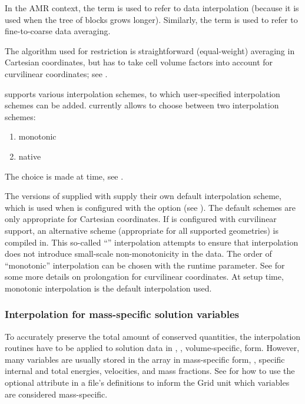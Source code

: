 In the AMR context, the term %
is used to refer to data interpolation
(because it is used when the tree of blocks grows longer).
Similarly, the term %
is used to refer to fine-to-coarse data averaging.

The algorithm used for restriction is straightforward (equal-weight)
averaging in Cartesian coordinates, but has to
take cell volume factors into account for curvilinear coordinates;
see .


\Paramesh supports various interpolation%
schemes, to which user-specified interpolation schemes can be added.
\flashx currently allows to choose between two interpolation schemes:
\begin{enumerate}
\item monotonic
\item native
\end{enumerate}
The choice is made at  time, see .



The versions of \Paramesh supplied with \flashx supply their own
default interpolation scheme, which is used when \flashx is
configured with the  
option (see ). The default schemes are only
appropriate for Cartesian coordinates. If \flashx is configured
with curvilinear support, an alternative scheme (appropriate for all
supported geometries) is compiled in. This so-called
``'' interpolation attempts to ensure that
interpolation does not introduce small-scale non-monotonicity in the
data. The order of ``monotonic'' interpolation can be chosen with the
runtime
parameter. See  for some more details
on prolongation for curvilinear coordinates.  At setup time, monotonic
interpolation is the default interpolation used.


\subsubsection{Interpolation for mass-specific solution variables}
\label{Sec:InterpMassSpecific}
To accurately preserve the total amount of conserved quantities,
the interpolation routines have to be applied to solution data in
, \ie, volume-specific, form. However, many variables
are usually stored in the  array in mass-specific form,
\eg, specific internal and total energies, velocities, and mass
fractions. See  for how to use
the optional  attribute in a  file's
 definitions to inform the \unit{Grid} unit
which variables are considered mass-specific.

